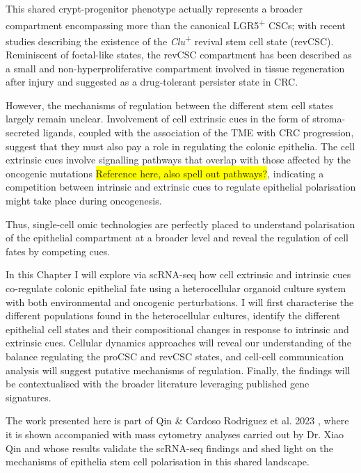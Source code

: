 This shared crypt-progenitor phenotype actually represents a broader compartment encompassing more than the canonical LGR5\textsuperscript{+} CSCs; with recent studies describing the existence of the \emph{Clu}\textsuperscript{+} revival stem cell state (revCSC). Reminiscent of foetal-like states, the revCSC compartment has been described as a small and non-hyperproliferative compartment involved in tissue regeneration after injury and suggested as a drug-tolerant persister state in CRC. 

However, the mechanisms of regulation between the different stem cell states largely remain unclear.
Involvement of cell extrinsic cues in the form of stroma-secreted ligands, coupled with the association of the TME with CRC progression, suggest that they must also pay a role in regulating the colonic epithelia. The cell extrinsic cues involve signalling pathways that overlap with those affected by the oncogenic mutations \colorbox{yellow}{Reference here\cite{sphyris_subversion_2021}, also spell out pathways?}, indicating a competition between intrinsic and extrinsic cues to regulate epithelial polarisation might take place during oncogenesis.


Thus, single-cell omic technologies are perfectly placed to understand polarisation of the epithelial compartment at a broader level and reveal the regulation of cell fates by competing cues.

In this Chapter I will explore via scRNA-seq how cell extrinsic and intrinsic cues co-regulate colonic epithelial fate using a heterocellular organoid culture system with both environmental and oncogenic perturbations. I will first characterise the different populations found in the heterocellular cultures, identify the different epithelial cell states and their compositional changes in response to intrinsic and extrinsic cues. Cellular dynamics approaches will reveal our understanding of the balance regulating the proCSC and revCSC states, and cell-cell communication analysis will suggest putative mechanisms of regulation. Finally, the findings will be contextualised with the broader literature leveraging published gene signatures.

The work presented here is part of Qin \& Cardoso Rodriguez et al. 2023 \cite{cardoso_rodriguez_single-cell_2023}, where it is shown accompanied with mass cytometry analyses carried out by Dr. Xiao Qin and whose results validate the scRNA-seq findings and shed light on the mechanisms of epithelia stem cell polarisation in this shared landscape.


